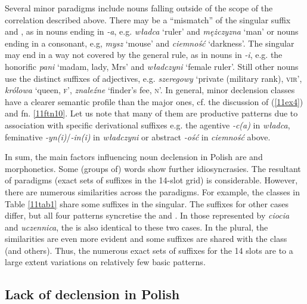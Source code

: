 \documentclass[output=paper,colorlinks,citecolor=brown]{langscibook}
\begin{document}
Several minor paradigms include nouns falling outside of the scope of the correlation described above. There may be a ``mismatch'' of the  singular suffix and , as in  nouns ending in \emph{-a}, e.g. \emph{władca} `ruler' and \emph{mężczyzna} `man' or  nouns ending in a consonant, e.g, \emph{mysz} `mouse' and \emph{ciemność} `darkness'. The  singular may end in a way not covered by the general rule, as in  nouns in \emph{-i}, e.g. the honorific \emph{pani} `madam, lady, Mrs' and \emph{władczyni} `female ruler'. Still other nouns use the distinct suffixes of adjectives, e.g. \emph{szeregowy} `private (military rank), \textsc{vir}', \emph{królowa} `queen, \textsc{f}', \emph{znaleźne} `finder's fee, \textsc{n}'. In general, minor declension classes have a clearer semantic profile than the major ones, cf. the discussion of (\ref{11ex4}) and fn. \ref{11ftn10}. Let us note that many of them are productive patterns due to association with specific derivational suffixes e.g. the agentive \emph{-c(a)} in \emph{władca}, feminative \emph{-yn(i)}/\emph{-in(i)} in \emph{władczyni} or abstract \emph{-ość} in \emph{ciemność} above.

In sum, the main factors influencing noun declension in Polish are  and morphonetics. Some (groups of) words show further idiosyncrasies. The resultant  of paradigms (exact sets of suffixes in the 14-slot grid) is considerable. However, there are numerous similarities across the paradigms. For example, the  classes in Table \ref{11tab1} share some suffixes in the singular. The suffixes for other cases differ, but all four patterns syncretise the  and . In those represented by \emph{ciocia} and \emph{uczennica}, the  is also identical to these two cases. In the plural, the similarities are even more evident and some suffixes are shared with the  class (and others). Thus, the numerous exact sets of suffixes for the 14 slots are to a large extent variations on relatively few basic patterns.

\subsection{Lack of declension in Polish} \label{11sec2.2}
\end{document}

